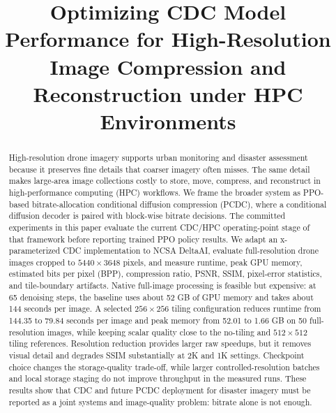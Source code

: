 \documentclass[conference]{IEEEtran}
\begin{document}
\title{Optimizing CDC Model Performance for High-Resolution Image Compression and Reconstruction under HPC Environments}

\author{
}

\maketitle

\begin{abstract}
High-resolution drone imagery supports urban monitoring and disaster assessment because it preserves fine details that coarser imagery often misses. The same detail makes large-area image collections costly to store, move, compress, and reconstruct in high-performance computing (HPC) workflows. We frame the broader system as PPO-based bitrate-allocation conditional diffusion compression (PCDC), where a conditional diffusion decoder is paired with block-wise bitrate decisions. The committed experiments in this paper evaluate the current CDC/HPC operating-point stage of that framework before reporting trained PPO policy results. We adapt an x-parameterized CDC implementation to NCSA DeltaAI, evaluate full-resolution drone images cropped to $5440 \times 3648$ pixels, and measure runtime, peak GPU memory, estimated bits per pixel (BPP), compression ratio, PSNR, SSIM, pixel-error statistics, and tile-boundary artifacts. Native full-image processing is feasible but expensive: at 65 denoising steps, the baseline uses about 52 GB of GPU memory and takes about 144 seconds per image. A selected $256 \times 256$ tiling configuration reduces runtime from 144.35 to 79.84 seconds per image and peak memory from 52.01 to 1.66 GB on 50 full-resolution images, while keeping scalar quality close to the no-tiling and $512 \times 512$ tiling references. Resolution reduction provides larger raw speedups, but it removes visual detail and degrades SSIM substantially at 2K and 1K settings. Checkpoint choice changes the storage-quality trade-off, while larger controlled-resolution batches and local storage staging do not improve throughput in the measured runs. These results show that CDC and future PCDC deployment for disaster imagery must be reported as a joint systems and image-quality problem: bitrate alone is not enough.
\end{abstract}
\end{document}
